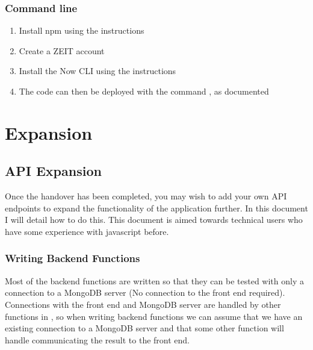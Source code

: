 \documentclass[letterpaper,10pt,english]{sphinxmanual}
\begin{document}
\subsection{Command line}
\label{\detokenize{docs/Installation/frontEnd:command-line}}\begin{enumerate}
%
\item {} 
Install npm using the instructions

\item {} 
Create a ZEIT account 

\item {} 
Install the Now CLI using the instructions

\item {} 
The code can then be deployed with the command , as documented

\end{enumerate}


\chapter{Expansion}
\label{\detokenize{index:expansion}}

\section{API Expansion}
\label{\detokenize{docs/Expansion/api-expansion:api-expansion}}\label{\detokenize{docs/Expansion/api-expansion::doc}}
Once the handover has been completed, you may wish to add your own API
endpoints to expand the functionality of the application further. In
this document I will detail how to do this. This document is aimed
towards technical users who have some experience with javascript before.


\subsection{Writing Back\sphinxhyphen{}end Functions}
\label{\detokenize{docs/Expansion/api-expansion:writing-back-end-functions}}
Most of the back\sphinxhyphen{}end functions are written so that they can be tested
with only a connection to a MongoDB server (No connection to the front
end required). Connections with the front end and MongoDB server are
handled by other functions in , so when writing
back\sphinxhyphen{}end functions we can assume that we have an existing connection to
a MongoDB server and that some other function will handle communicating
the result to the front end.
\end{document}
